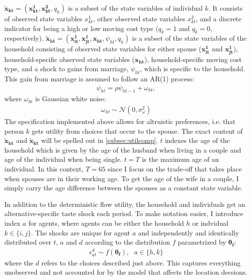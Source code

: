 $\boldsymbol{\tilde{x}_{kt}}=(\boldsymbol{x_{kt}^1},\boldsymbol{x_{kt}^2},q_h)$ is a subset of the state variables of individual $k$. It consists of observed state variables $x_{kt}^1$, other observed state variables $x_{kt}^2$, and a discrete indicator for being a high or low moving cost type ($q_k=1$ and $q_k=0$, respectively). $\boldsymbol{\tilde{x}_{ht}}=(\boldsymbol{x_{it}^1},\boldsymbol{x_{jt}^1},\boldsymbol{x_{ht}},\psi_{ht},q_h)$ is a subset of the state variables of the household consisting of observed state variables for either spouse ($\boldsymbol{x_{it}^1}$ and $\boldsymbol{x_{jt}^1}$), household-specific observed state variables ($\boldsymbol{x_{ht}}$), household-specific moving cost type,  and a shock to gains from marriage, $\psi_{ht}$, which is specific to the household. This gain from marriage is assumed to follow an AR(1) process:
\begin{align*}
\psi_{ht} = \rho \psi_{ht-1}+\omega_{ht},
\end{align*}
where $\omega_{ht}$ is Gaussian white noise:
\begin{align*}
\omega_{ht}\sim \mathcal{N}(0,\sigma_{\omega}^2)
\end{align*}
The specification implemented above allows for altruistic preferences, i.e. that person $k$ gets utility from choices that occur to the spouse. The exact content of $\boldsymbol{\tilde{x}_{ht}}$ and $\boldsymbol{\tilde{x}_{kt}}$ will be spelled out in \autoref{subsec:utilcomp}. $t$ indexes the age of the household which is given by the age of the husband when living in a couple and age of the individual when being single. $t=T$ is the maximum age of an individual. In this context, $T=65$ since I focus on the trade-off that takes place when spouses are in their working age. To get the age of the wife in a couple, I simply carry the age difference between the spouses as a constant state variable. 

In addition to the deterministic flow utility, the household and individuals get an alternative-specific taste shock each period. To make notation easier, I introduce index $a$ for agents, where agents can be either the household $h$ or indvidual $k\in\{i,j\}$. The shocks are unique for agent $a$ and independently and identically distributed over $t$, $a$ and $d$ according to the distribution $f$ parametrized by $\boldsymbol{\theta_f}$:
\begin{align}
\epsilon_{at}^d \sim f(\boldsymbol{\theta_f}),\text{ }a\in\{h,k\}
\label{eq:shock}
\end{align}
where the $d$ refers to the choices described just above. This captures everything unobserved and not accounted for by the model that affects the location decsions.

